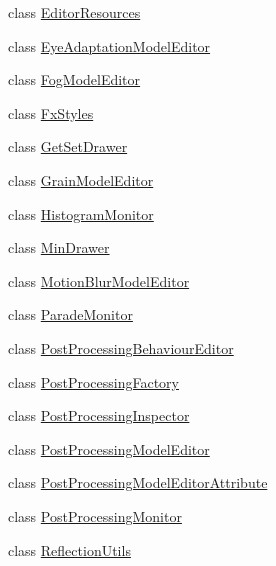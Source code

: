 \begin{DoxyCompactItemize}
\item 
class \hyperlink{class_unity_editor_1_1_post_processing_1_1_editor_resources}{Editor\+Resources}
\item 
class \hyperlink{class_unity_editor_1_1_post_processing_1_1_eye_adaptation_model_editor}{Eye\+Adaptation\+Model\+Editor}
\item 
class \hyperlink{class_unity_editor_1_1_post_processing_1_1_fog_model_editor}{Fog\+Model\+Editor}
\item 
class \hyperlink{class_unity_editor_1_1_post_processing_1_1_fx_styles}{Fx\+Styles}
\item 
class \hyperlink{class_unity_editor_1_1_post_processing_1_1_get_set_drawer}{Get\+Set\+Drawer}
\item 
class \hyperlink{class_unity_editor_1_1_post_processing_1_1_grain_model_editor}{Grain\+Model\+Editor}
\item 
class \hyperlink{class_unity_editor_1_1_post_processing_1_1_histogram_monitor}{Histogram\+Monitor}
\item 
class \hyperlink{class_unity_editor_1_1_post_processing_1_1_min_drawer}{Min\+Drawer}
\item 
class \hyperlink{class_unity_editor_1_1_post_processing_1_1_motion_blur_model_editor}{Motion\+Blur\+Model\+Editor}
\item 
class \hyperlink{class_unity_editor_1_1_post_processing_1_1_parade_monitor}{Parade\+Monitor}
\item 
class \hyperlink{class_unity_editor_1_1_post_processing_1_1_post_processing_behaviour_editor}{Post\+Processing\+Behaviour\+Editor}
\item 
class \hyperlink{class_unity_editor_1_1_post_processing_1_1_post_processing_factory}{Post\+Processing\+Factory}
\item 
class \hyperlink{class_unity_editor_1_1_post_processing_1_1_post_processing_inspector}{Post\+Processing\+Inspector}
\item 
class \hyperlink{class_unity_editor_1_1_post_processing_1_1_post_processing_model_editor}{Post\+Processing\+Model\+Editor}
\item 
class \hyperlink{class_unity_editor_1_1_post_processing_1_1_post_processing_model_editor_attribute}{Post\+Processing\+Model\+Editor\+Attribute}
\item 
class \hyperlink{class_unity_editor_1_1_post_processing_1_1_post_processing_monitor}{Post\+Processing\+Monitor}
\item 
class \hyperlink{class_unity_editor_1_1_post_processing_1_1_reflection_utils}{Reflection\+Utils}

\end{DoxyCompactItemize}
